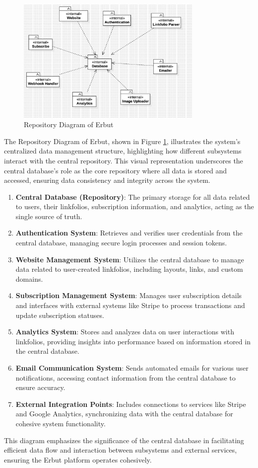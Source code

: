 \documentclass[a4paper]{report}
\begin{document}
\begin{figure}[h!]
    \centering
    \includegraphics[width=0.8\textwidth]{images/erbut-repository-diagram.png}
    \caption{Repository Diagram of Erbut}
    \label{fig:repository-diagram}
\end{figure}

The Repository Diagram of Erbut, shown in Figure \ref{fig:repository-diagram}, illustrates the system's centralized data management structure, highlighting how different subsystems interact with the central repository. This visual representation underscores the central database's role as the core repository where all data is stored and accessed, ensuring data consistency and integrity across the system.

\begin{enumerate}
    \item \textbf{Central Database (Repository)}: The primary storage for all data related to users, their linkfolios, subscription information, and analytics, acting as the single source of truth.
    \item \textbf{Authentication System}: Retrieves and verifies user credentials from the central database, managing secure login processes and session tokens.
    \item \textbf{Website Management System}: Utilizes the central database to manage data related to user-created linkfolios, including layouts, links, and custom domains.
    \item \textbf{Subscription Management System}: Manages user subscription details and interfaces with external systems like Stripe to process transactions and update subscription statuses.
    \item \textbf{Analytics System}: Stores and analyzes data on user interactions with linkfolios, providing insights into performance based on information stored in the central database.
    \item \textbf{Email Communication System}: Sends automated emails for various user notifications, accessing contact information from the central database to ensure accuracy.
    \item \textbf{External Integration Points}: Includes connections to services like Stripe and Google Analytics, synchronizing data with the central database for cohesive system functionality.
\end{enumerate}

This diagram emphasizes the significance of the central database in facilitating efficient data flow and interaction between subsystems and external services, ensuring the Erbut platform operates cohesively.
\end{document}
